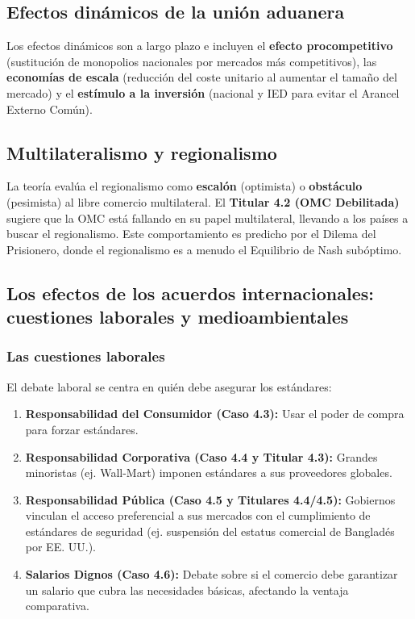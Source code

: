 \subsection{Efectos dinámicos de la unión aduanera}
Los efectos dinámicos son a largo plazo e incluyen el \textbf{efecto procompetitivo} (sustitución de monopolios nacionales por mercados más competitivos), las \textbf{economías de escala} (reducción del coste unitario al aumentar el tamaño del mercado) y el \textbf{estímulo a la inversión} (nacional y IED para evitar el Arancel Externo Común).

\subsection{Multilateralismo y regionalismo}
La teoría evalúa el regionalismo como \textbf{escalón} (optimista) o \textbf{obstáculo} (pesimista) al libre comercio multilateral. El \textbf{Titular 4.2 (OMC Debilitada)} sugiere que la OMC está fallando en su papel multilateral, llevando a los países a buscar el regionalismo. Este comportamiento es predicho por el Dilema del Prisionero, donde el regionalismo es a menudo el Equilibrio de Nash subóptimo.

\subsection{Los efectos de los acuerdos internacionales: cuestiones laborales y medioambientales}

\subsubsection{Las cuestiones laborales}
El debate laboral se centra en quién debe asegurar los estándares:
\begin{enumerate}
    \item \textbf{Responsabilidad del Consumidor (Caso 4.3):} Usar el poder de compra para forzar estándares.
    \item \textbf{Responsabilidad Corporativa (Caso 4.4 y Titular 4.3):} Grandes minoristas (ej. Wall-Mart) imponen estándares a sus proveedores globales.
    \item \textbf{Responsabilidad Pública (Caso 4.5 y Titulares 4.4/4.5):} Gobiernos vinculan el acceso preferencial a sus mercados con el cumplimiento de estándares de seguridad (ej. suspensión del estatus comercial de Bangladés por EE. UU.).
    \item \textbf{Salarios Dignos (Caso 4.6):} Debate sobre si el comercio debe garantizar un salario que cubra las necesidades básicas, afectando la ventaja comparativa.
\end{enumerate}

